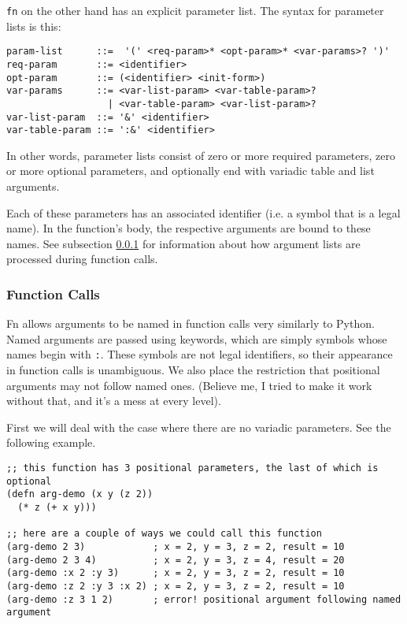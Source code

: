 \documentclass[11pt]{article}
\begin{document}
\texttt{fn} on the other hand has an explicit parameter list. The syntax for parameter
lists is this:
\begin{verbatim}
param-list      ::=  '(' <req-param>* <opt-param>* <var-params>? ')'
req-param       ::= <identifier>
opt-param       ::= (<identifier> <init-form>)
var-params      ::= <var-list-param> <var-table-param>?
                  | <var-table-param> <var-list-param>?
var-list-param  ::= '&' <identifier>
var-table-param ::= ':&' <identifier>
\end{verbatim}

In other words, parameter lists consist of zero or more required parameters,
zero or more optional parameters, and optionally end with variadic table and
list arguments.

Each of these parameters has an associated identifier (i.e. a symbol that is a
legal name). In the function's body, the respective arguments are bound to these
names. See subsection \ref{sec:orgc5c7f45} for information about how argument lists
are processed during function calls.


\subsubsection{Function Calls}
\label{sec:orgc5c7f45}

Fn allows arguments to be named in function calls very similarly to Python.
Named arguments are passed using keywords, which are simply symbols whose names
begin with \texttt{:}. These symbols are not legal identifiers, so their appearance in
function calls is unambiguous. We also place the restriction that positional
arguments may not follow named ones. (Believe me, I tried to make it work
without that, and it's a mess at every level).

First we will deal with the case where there are no variadic parameters. See the
following example.
\begin{verbatim}
;; this function has 3 positional parameters, the last of which is optional
(defn arg-demo (x y (z 2))
  (* z (+ x y)))

;; here are a couple of ways we could call this function
(arg-demo 2 3)            ; x = 2, y = 3, z = 2, result = 10
(arg-demo 2 3 4)          ; x = 2, y = 3, z = 4, result = 20
(arg-demo :x 2 :y 3)      ; x = 2, y = 3, z = 2, result = 10
(arg-demo :z 2 :y 3 :x 2) ; x = 2, y = 3, z = 2, result = 10
(arg-demo :z 3 1 2)       ; error! positional argument following named argument
\end{verbatim}
\end{document}
